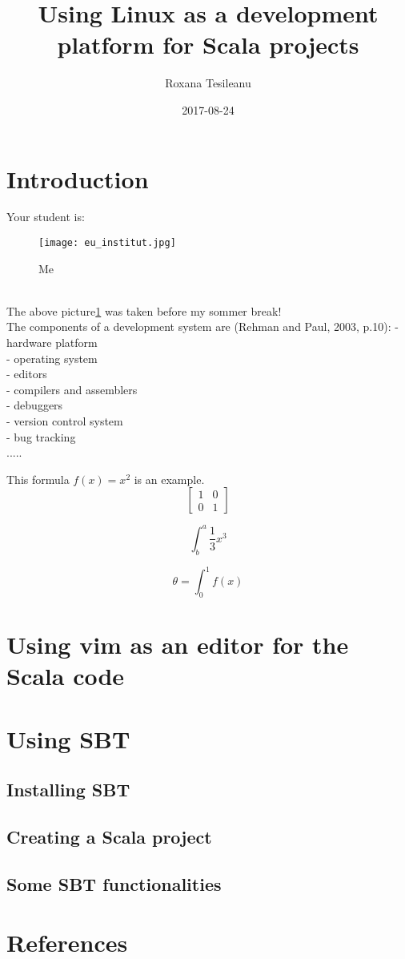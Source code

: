 \documentclass{article}
\title{Using Linux as a development platform for Scala projects}
\date{2017-08-24}
\author{Roxana Tesileanu}
\begin{document}
	\maketitle
	\newpage

\section{Introduction}

Your student is:\\
\begin{figure} [h!]
 \texttt{[image: eu\_institut.jpg]}
 \caption{Me}
 \label{fig: Roxi}
\end{figure}
\\
The above picture\ref{fig: Roxi}  was taken before my sommer break!
\\

The components of a development system are (Rehman and Paul, 2003, p.10):\newline
- hardware platform \\
- operating system \\
- editors \\
- compilers and assemblers \\
- debuggers \\
- version control system \\
- bug tracking \\

.....

This formula $f(x) = x^2$ is an example.
\begin{equation}
\left[
\begin{matrix}
1 & 0 \\
0 & 1
\end{matrix}
\right]
\end{equation}

\begin{equation}
\int^a_b\frac{1}{3}x^3
\end{equation}

\begin{equation}
\theta = \int^1_0 f(x)
\end{equation}



\section{Using vim as an editor for the Scala code}
\section{Using SBT}
\subsection{Installing SBT}
\subsection{Creating a Scala project}
\subsection{Some SBT functionalities}
\section{References}

  
\end{document}
